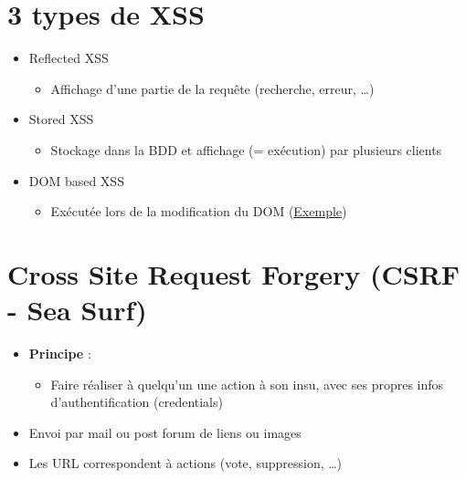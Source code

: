 \hypertarget{types-de-xss}{%
\section{3 types de XSS}\label{types-de-xss}}

\begin{itemize}
\tightlist
\item
  Reflected XSS

  \begin{itemize}
  \tightlist
  \item
    Affichage d'une partie de la requête (recherche, erreur, \ldots{})
  \end{itemize}
\item
  Stored XSS

  \begin{itemize}
  \tightlist
  \item
    Stockage dans la BDD et affichage (= exécution) par plusieurs
    clients
  \end{itemize}
\item
  DOM based XSS

  \begin{itemize}
  \tightlist
  \item
    Exécutée lors de la modification du DOM
    (\href{https://www.owasp.org/index.php/DOM_Based_XSS}{Exemple})
  \end{itemize}
\end{itemize}

\hypertarget{cross-site-request-forgery-csrf---sea-surf}{%
\section{Cross Site Request Forgery (CSRF - Sea
Surf)}\label{cross-site-request-forgery-csrf---sea-surf}}

\begin{itemize}
\tightlist
\item
  \textbf{Principe} :

  \begin{itemize}
  \tightlist
  \item
    Faire réaliser à quelqu'un une action à son insu, avec ses propres
    infos d'authentification (credentials)
  \end{itemize}
\item
  Envoi par mail ou post forum de liens ou images
\item
  Les URL correspondent à actions (vote, suppression, \ldots{})
\end{itemize}

